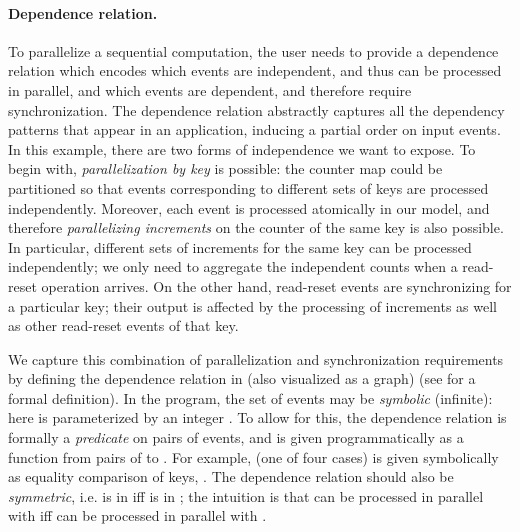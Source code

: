 \paragraph{Dependence relation.}
To parallelize a sequential computation, the user needs to provide a
dependence relation which encodes which events are independent, and
thus can be processed in parallel, and which events are dependent, and
therefore require synchronization.  The dependence relation abstractly
captures all the dependency patterns that appear in an application,
inducing a partial order on input events. In this example, there are
two forms of independence we want to expose. To begin with,
\emph{parallelization by key} is possible: the counter map could be
partitioned so that events corresponding to different sets of keys are processed
independently. Moreover, each event is processed atomically in our model,
and therefore \emph{parallelizing increments} on the
counter of the same key is also possible. In particular, different
sets of increments for the same key can be processed independently; we
only need to aggregate the independent counts when a read-reset
operation arrives. On the other hand, read-reset events
are synchronizing for a particular key;
their output is affected by the processing of increments
as well as other read-reset events of that key.

We capture this combination of parallelization and synchronization
requirements by defining the dependence relation
 in 
(also visualized as a graph)
(see  for a formal definition).
In the program, the set of events may be \emph{symbolic}
(infinite): here  is parameterized by an integer .
To allow for this, the dependence relation
is formally a \emph{predicate} on pairs of events,
and is given programmatically as a function from pairs
of  to .
For example,  (one of four cases)
is given symbolically as equality comparison of keys, .
The dependence relation should also be \emph{symmetric},
i.e.  is in  iff  is in ;
the intuition is that  can be processed in parallel with  iff  can be processed in parallel with .

